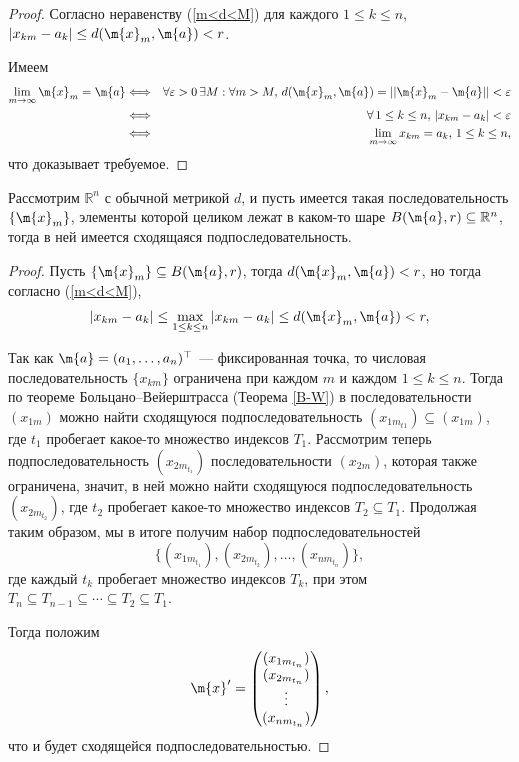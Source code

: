 \begin{proof}
Согласно неравенству (\ref{m<d<M}) для каждого $1 \le k \le n$, $|x_{km} - a_k| \le d(\m{x}_m, \m{a})<r$.

Имеем 
    \begin{eqnarray*}
        \lim_{m \to \infty} \m{x}_m = \m{a} &\Longleftrightarrow& \forall \varepsilon >0 \, \exists M : \forall m >M, \, d(\m{x}_m, \m{a}) = ||\m{x}_m - \m{a}|| < \varepsilon \\
        &\Longleftrightarrow& \forall\, 1 \le k \le n,\, |x_{km} - a_k| < \varepsilon \\
        &\Longleftrightarrow & \lim_{m \to \infty}x_{km} = a_k,\, 1 \le k \le n,
    \end{eqnarray*}
    что доказывает требуемое.
\end{proof}


\begin{theorem}\label{genB-W}
    Рассмотрим $\mathbb{R}^n$ с обычной метрикой $d$, и пусть имеется такая последовательность $\{\m{x}_m\}$, элементы которой целиком лежат в каком-то шаре $B(\m{a},r)\subseteq \mathbb{R}^n$, тогда в ней имеется сходящаяся подпоследовательность.
\end{theorem}
\begin{proof}

    Пусть $\{\m{x}_m\} \subseteq B(\m{a},r)$, тогда $d(\m{x}_m, \m{a})<r$, но тогда согласно (\ref{m<d<M}),
    \[
     |x_{km} - a_k| \le \max_{1\le k \le n}| x_{km} - a_{k}  | \le d(\m{x}_m, \m{a})<r,
    \]

Так как $\m{a} =(a_1,\ldots, a_n)^\top$ --- фиксированная точка, то числовая последовательность $\{x_{km}\}$ ограничена при каждом $m$ и каждом $1\le k \le n$. Тогда по теореме Больцано--Вейерштрасса (Теорема \ref{B-W}) в последовательности $(x_{1m})$ можно найти сходящуюся подпоследовательность $(x_{1m_{t1}}) \subseteq (x_{1m})$, где $t_1$ пробегает какое-то множество индексов $T_1$. Рассмотрим теперь подпоследовательность $(x_{2m_{t_1}})$ последовательности $(x_{2m})$, которая также ограничена, значит, в ней можно найти сходящуюся подпоследовательность $(x_{2m_{t_2}})$, где $t_2$ пробегает какое-то множество индексов $T_2 \subseteq T_1$. Продолжая таким образом, мы в итоге получим набор подпоследовательностей
\[
 \{(x_{1m_{t_1}}), (x_{2m_{t_2}}), \ldots, (x_{nm_{t_n}})\},
\]
где каждый $t_k$ пробегает множество индексов $T_k$, при этом $T_n \subseteq T_{n-1} \subseteq \cdots \subseteq T_2 \subseteq T_1.$

Тогда положим 
\[
  \m{x}' = \begin{pmatrix}
      (x_{1m_{t_n}}) \\
      (x_{2m_{t_n}}) \\
      \vdots \\
      (x_{nm_{t_n}})
  \end{pmatrix},
\]
что и будет сходящейся подпоследовательностью.    
\end{proof}

